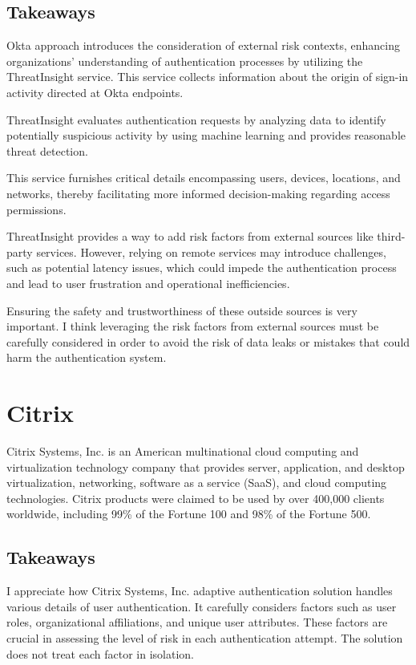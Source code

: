 \newpage
\subsection*{Takeaways}
Okta approach introduces the consideration of external risk contexts, enhancing organizations' understanding of authentication processes by utilizing the ThreatInsight service.
This service collects information about the origin of sign-in activity directed at Okta endpoints.

ThreatInsight evaluates authentication requests by analyzing data to identify potentially suspicious activity by using machine learning and provides reasonable threat detection. 

This service furnishes critical details encompassing users, devices, locations, and networks, thereby facilitating more informed decision-making regarding access permissions.

ThreatInsight provides a way to add risk factors from external sources like third-party services. However, relying on remote services may introduce challenges, such as potential latency issues, which could impede the authentication process and lead to user frustration and operational inefficiencies.\cite{existing-okta-lowrisk} \cite{existing-okta-confidence}

Ensuring the safety and trustworthiness of these outside sources is very important.
I think leveraging the risk factors from external sources must be carefully considered in order to avoid the risk of data leaks or mistakes that could harm the authentication system.

\newpage
\section{Citrix}

Citrix Systems, Inc. is an American multinational cloud computing and virtualization technology company that provides server, application, and desktop virtualization, networking, software as a service (SaaS), and cloud computing technologies.
Citrix products were claimed to be used by over 400,000 clients worldwide, including 99\% of the Fortune 100 and 98\% of the Fortune 500.

\subsection*{Takeaways}
I appreciate how Citrix Systems, Inc. adaptive authentication solution handles various details of user authentication.
It carefully considers factors such as user roles, organizational affiliations, and unique user attributes.
These factors are crucial in assessing the level of risk in each authentication attempt.
The solution does not treat each factor in isolation.\cite{existing-citrix-wiki} \cite{existing-citrix-blog}

